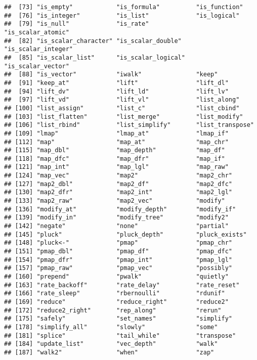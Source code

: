 \documentclass[
]{book}
\begin{document}
\begin{verbatim}
##  [73] "is_empty"            "is_formula"          "is_function"        
##  [76] "is_integer"          "is_list"             "is_logical"         
##  [79] "is_null"             "is_rate"             "is_scalar_atomic"   
##  [82] "is_scalar_character" "is_scalar_double"    "is_scalar_integer"  
##  [85] "is_scalar_list"      "is_scalar_logical"   "is_scalar_vector"   
##  [88] "is_vector"           "iwalk"               "keep"               
##  [91] "keep_at"             "lift"                "lift_dl"            
##  [94] "lift_dv"             "lift_ld"             "lift_lv"            
##  [97] "lift_vd"             "lift_vl"             "list_along"         
## [100] "list_assign"         "list_c"              "list_cbind"         
## [103] "list_flatten"        "list_merge"          "list_modify"        
## [106] "list_rbind"          "list_simplify"       "list_transpose"     
## [109] "lmap"                "lmap_at"             "lmap_if"            
## [112] "map"                 "map_at"              "map_chr"            
## [115] "map_dbl"             "map_depth"           "map_df"             
## [118] "map_dfc"             "map_dfr"             "map_if"             
## [121] "map_int"             "map_lgl"             "map_raw"            
## [124] "map_vec"             "map2"                "map2_chr"           
## [127] "map2_dbl"            "map2_df"             "map2_dfc"           
## [130] "map2_dfr"            "map2_int"            "map2_lgl"           
## [133] "map2_raw"            "map2_vec"            "modify"             
## [136] "modify_at"           "modify_depth"        "modify_if"          
## [139] "modify_in"           "modify_tree"         "modify2"            
## [142] "negate"              "none"                "partial"            
## [145] "pluck"               "pluck_depth"         "pluck_exists"       
## [148] "pluck<-"             "pmap"                "pmap_chr"           
## [151] "pmap_dbl"            "pmap_df"             "pmap_dfc"           
## [154] "pmap_dfr"            "pmap_int"            "pmap_lgl"           
## [157] "pmap_raw"            "pmap_vec"            "possibly"           
## [160] "prepend"             "pwalk"               "quietly"            
## [163] "rate_backoff"        "rate_delay"          "rate_reset"         
## [166] "rate_sleep"          "rbernoulli"          "rdunif"             
## [169] "reduce"              "reduce_right"        "reduce2"            
## [172] "reduce2_right"       "rep_along"           "rerun"              
## [175] "safely"              "set_names"           "simplify"           
## [178] "simplify_all"        "slowly"              "some"               
## [181] "splice"              "tail_while"          "transpose"          
## [184] "update_list"         "vec_depth"           "walk"               
## [187] "walk2"               "when"                "zap"
\end{verbatim}
\end{document}
